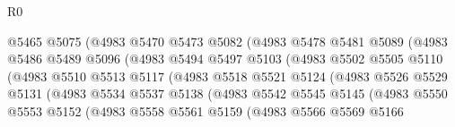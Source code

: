 \begin{lexlean}{R0}
\begin{coremodule}
                              @5465
                              @5075
                              (@4983
                                @5470
                                @5473
                                @5082
                                (@4983
                                  @5478
                                  @5481
                                  @5089
                                  (@4983
                                    @5486
                                    @5489
                                    @5096
                                    (@4983
                                      @5494
                                      @5497
                                      @5103
                                      (@4983
                                        @5502
                                        @5505
                                        @5110
                                        (@4983
                                          @5510
                                          @5513
                                          @5117
                                          (@4983
                                            @5518
                                            @5521
                                            @5124
                                            (@4983
                                              @5526
                                              @5529
                                              @5131
                                              (@4983
                                                @5534
                                                @5537
                                                @5138
                                                (@4983
                                                  @5542
                                                  @5545
                                                  @5145
                                                  (@4983
                                                    @5550
                                                    @5553
                                                    @5152
                                                    (@4983
                                                      @5558
                                                      @5561
                                                      @5159
                                                      (@4983
                                                        @5566
                                                        @5569
                                                        @5166

\end{coremodule}
\end{lexlean}
